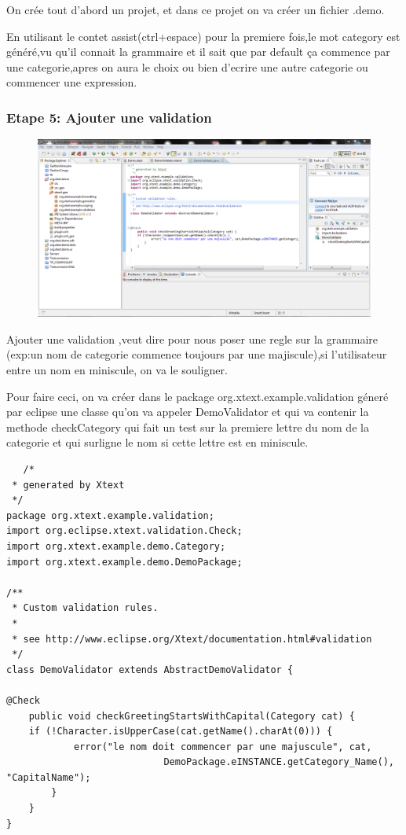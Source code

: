 \documentclass{article}
\begin{document}
On crée tout d'abord un projet, et dans ce projet on va créer un fichier .demo.

En utilisant le contet assist(ctrl+espace) pour la premiere fois,le mot category est généré,vu qu'il connait la grammaire et il sait que par default ça commence par une categorie,apres on aura le choix ou bien d'ecrire une autre categorie ou commencer une expression.


\subsubsection{Etape 5: Ajouter une validation}

\begin{figure}[h]
	\centering
		\includegraphics[width=1.10\textwidth]{5.PNG}
	\label{fig:5}
\end{figure}\FloatBarrier


Ajouter une validation ,veut dire pour nous poser une regle sur la grammaire (exp:un nom de categorie commence toujours par une majiscule),si l'utilisateur entre un nom en miniscule, on va le souligner.

Pour faire ceci, on va créer dans le package org.xtext.example.validation géneré par eclipse une classe qu'on va appeler DemoValidator et qui va contenir la methode checkCategory qui fait un test sur la premiere lettre du nom de la categorie et qui surligne le nom si cette lettre est en miniscule.

\begin{verbatim}
   /*
 * generated by Xtext
 */
package org.xtext.example.validation;
import org.eclipse.xtext.validation.Check;
import org.xtext.example.demo.Category;
import org.xtext.example.demo.DemoPackage;

/**
 * Custom validation rules. 
 *
 * see http://www.eclipse.org/Xtext/documentation.html#validation
 */
class DemoValidator extends AbstractDemoValidator {

@Check
	public void checkGreetingStartsWithCapital(Category cat) {
	if (!Character.isUpperCase(cat.getName().charAt(0))) {
			error("le nom doit commencer par une majuscule", cat,
							DemoPackage.eINSTANCE.getCategory_Name(), "CapitalName");
		}
	}
}
\end{verbatim}
\end{document}
